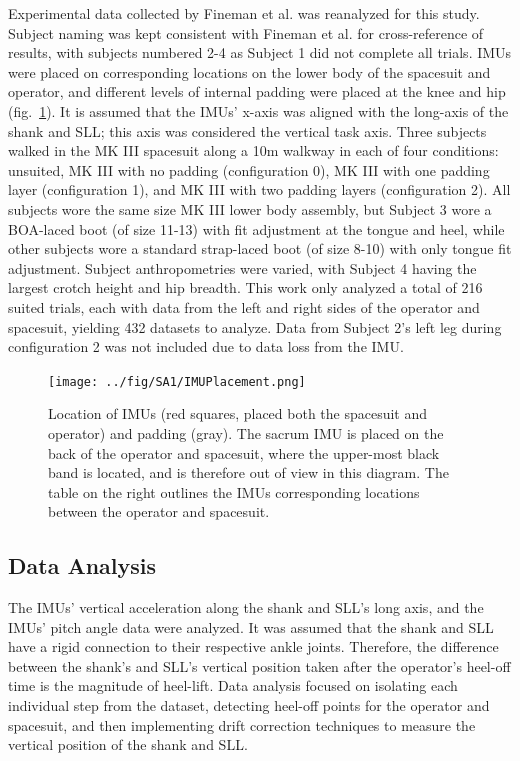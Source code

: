 \documentclass[defaultstyle,11pt]{thesis}
\begin{document}
Experimental data collected by Fineman et al.\citep{Fineman2018} was reanalyzed for this study.
Subject naming was kept consistent with Fineman et al.\citep{Fineman2018} for cross-reference of results, with subjects numbered 2-4 as Subject 1 did not complete all trials.
IMUs were placed on corresponding locations on the lower body of the spacesuit and operator, and different levels of internal padding were placed at the knee and hip (fig.~\ref{fig:SA1-Loc}).
It is assumed that the IMUs' x-axis was aligned with the long-axis of the shank and SLL; this axis was considered the vertical task axis.
Three subjects walked in the MK III spacesuit along a 10m walkway in each of four conditions: unsuited, MK III with no padding (configuration 0), MK III with one padding layer (configuration 1), and MK III with two padding layers (configuration 2).
All subjects wore the same size MK III lower body assembly, but Subject 3 wore a BOA-laced boot (of size 11-13) with fit adjustment at the tongue and heel, while other subjects wore a standard strap-laced boot (of size 8-10) with only tongue fit adjustment.
Subject anthropometries were varied, with Subject 4 having the largest crotch height and hip breadth.
This work only analyzed a total of 216 suited trials, each with data from the left and right sides of the operator and spacesuit, yielding 432 datasets to analyze.
Data from Subject 2's left leg during configuration 2 was not included due to data loss from the IMU.

\hypertarget{fig:SA1-Loc}{%
\begin{figure}
\centering
\texttt{[image: ../fig/SA1/IMUPlacement.png]}
\caption[{Location of IMUs and padding}]{Location of IMUs (red squares, placed both the spacesuit and operator) and padding (gray). The sacrum IMU is placed on the back of the operator and spacesuit, where the upper-most black band is located, and is therefore out of view in this diagram. The table on the right outlines the IMUs corresponding locations between the operator and spacesuit.}
\label{fig:SA1-Loc}
\end{figure}
}

\hypertarget{data-analysis}{%
\subsection{Data Analysis}\label{data-analysis}}

The IMUs' vertical acceleration along the shank and SLL's long axis, and the IMUs' pitch angle data were analyzed.
It was assumed that the shank and SLL have a rigid connection to their respective ankle joints.
Therefore, the difference between the shank's and SLL's vertical position taken after the operator's heel-off time is the magnitude of heel-lift.
Data analysis focused on isolating each individual step from the dataset, detecting heel-off points for the operator and spacesuit, and then implementing drift correction techniques to measure the vertical position of the shank and SLL.
\end{document}
